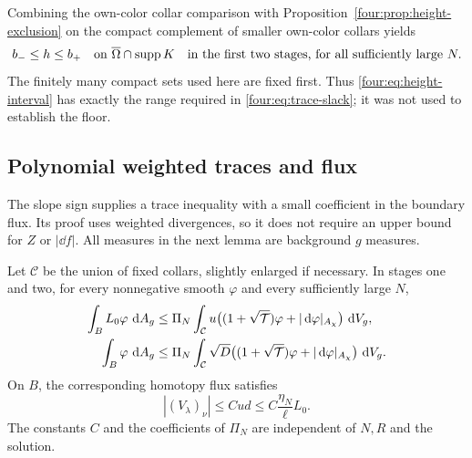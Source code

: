 Combining the own-color collar comparison with
Proposition~\ref{four:prop:height-exclusion} on the compact complement of
smaller own-color collars yields
\begin{equation}\label{four:eq:height-interval}
 b_-\le h\le b_+
 \quad\text{on }\overline\Omega\cap\operatorname{supp} K
 \quad\text{in the first two stages, for all sufficiently large }N.
\end{equation}
The finitely many compact sets used here are fixed first.  Thus
\eqref{four:eq:height-interval} has exactly the range required in
\eqref{four:eq:trace-slack}; it was not used to establish the floor.

\subsection{Polynomial weighted traces and flux}

The slope sign supplies a trace inequality with a small coefficient
in the boundary flux.  Its proof uses weighted divergences, so it
does not require an upper bound for $Z$ or $|\dd f|$.
All measures in the next lemma are background $g$ measures.

\begin{lemma}\label{four:lem:weighted-trace}
Let $\mathcal C$ be the union of fixed collars, slightly enlarged
if necessary.  In stages one and two, for every nonnegative smooth
$\varphi$ and every sufficiently large $N$,
\begin{align}
 \int_B L_0\varphi\,\,\mathrm d A_g
 &\le\Pi_N\int_{\mathcal C}u
       \bigl((1+\sqrt{\mathcal T})\varphi+|\,\mathrm d\varphi|_{A_\chi}\bigr)\,\,\mathrm d V_g,
       \label{four:bnd:weighted-trace}\\
 \int_B\varphi\,\,\mathrm d A_g
 &\le\Pi_N\int_{\mathcal C}\sqrt D
       \bigl((1+\sqrt{\mathcal T})\varphi+|\,\mathrm d\varphi|_{A_\chi}\bigr)\,\,\mathrm d V_g.
       \label{four:bnd:unweighted-trace}
\end{align}
On $B$, the corresponding homotopy flux satisfies
\begin{equation}\label{four:eq:boundary-flux-bound}
 |(V_\lambda)_\nu|\le Cud
 \le C\frac{\eta_N}{\ell}L_0.
\end{equation}
The constants $C$ and the coefficients of $\Pi_N$ are independent
of $N,R$ and the solution.
\end{lemma}


